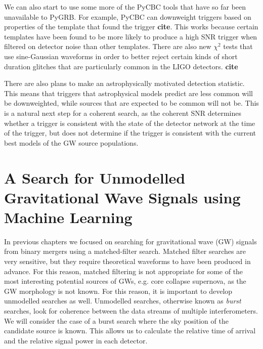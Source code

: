 \documentclass[11pt]{cuthesis}
\begin{document}
We can also start to use some more of the PyCBC tools that have so far been unavailable to PyGRB. For example, PyCBC can downweight triggers based on properties of the template that found the trigger \textbf{cite}. This works because certain templates have been found to be more likely to produce a high SNR trigger when filtered on detector noise than other templates. There are also new $\chi^2$ tests that use sine-Gaussian waveforms in order to better reject certain kinds of short duration glitches that are particularly common in the LIGO detectors. \textbf{cite}

There are also plans to make an astrophysically motivated detection statistic. This means that triggers that astrophysical models predict are less common will be downweighted, while sources that are expected to be common will not be. This is a natural next step for a coherent search, as the coherent SNR determines whether a trigger is consistent with the state of the detector network at the time of the trigger, but does not determine if the trigger is consistent with the current best models of the GW source populations.


\chapter{A Search for Unmodelled Gravitational Wave Signals using Machine Learning} \label{chap: mva}

In previous chapters we focused on searching for gravitational wave (GW) signals from binary mergers using a matched-filter search. Matched filter searches are very sensitive, but they require theoretical waveforms to have been produced in advance. For this reason, matched filtering is not appropriate for some of the most interesting potential sources of GWs, e.g. core collapse supernova, as the GW morphology is not known. For this reason, it is important to develop unmodelled searches as well. Unmodelled searches, otherwise known as \textit{burst} searches, look for coherence between the data streams of multiple interferometers. We will consider the case of a burst search where the sky position of the candidate source is known. This allows us to calculate the relative time of arrival and the relative signal power in each detector.
\end{document}
